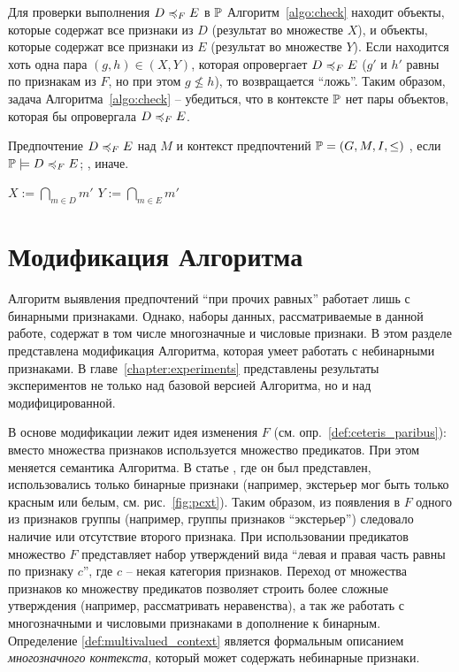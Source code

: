 		Для проверки выполнения $D \preccurlyeq_{F} E$ в $\mathbb{P}$ Алгоритм~\ref{algo:check} находит объекты, которые содержат все признаки из $D$ (результат во множестве $X$), и объекты, которые содержат все признаки из $E$ (результат во множестве $Y$). Если находится хоть одна пара $(g,h) \in (X, Y)$, которая опровергает $D \preccurlyeq_{F} E$ ($g'$ и $h'$ равны по признакам из $F$, но при этом $g \nleq h$), то возвращается ``ложь''. Таким образом, задача Алгоритма~\ref{algo:check} – убедиться, что в контексте $\mathbb{P}$ нет пары объектов, которая бы опровергала $D \preccurlyeq_{F} E$. 
	
	
		\begin{algorithm}
			\caption{$(\DEF, \PP)$ \cite[Алг.~2]{Obiedkov:2013}}
			\label{algo:check}
			\begin{algorithmic}[1]
				\REQUIRE Предпочтение $D \preccurlyeq_{F} E$ над $M$ и контекст предпочтений $\mathbb{P} = (G, M, I, \leq)$
				\ENSURE \TRUE, если $\mathbb{P} \models D \preccurlyeq_{F} E$; \FALSE, иначе.
				\item[]
				\STATE $X := \bigcap_{m \in D}m'$
				\STATE $Y := \bigcap_{m \in E}m'$
				\RETURN \FALSE
				\ENDIF
				\ENDFOR
				\ENDFOR
				\RETURN \TRUE
			\end{algorithmic}
		\end{algorithm}
		


\section{Модификация Алгоритма}	
\label{sec:modification}	
		
	Алгоритм выявления предпочтений \enquote{при прочих равных} работает лишь с бинарными признаками. Однако, наборы данных, рассматриваемые в данной работе, содержат в том числе многозначные и числовые признаки. В этом разделе представлена модификация Алгоритма, которая умеет работать с небинарными признаками. В главе~\ref{chapter:experiments} представлены результаты экспериментов не только над базовой версией Алгоритма, но и над модифицированной.
	
	В основе модификации лежит идея изменения $F$ (см. опр.~\ref{def:ceteris_paribus}): вместо множества признаков используется множество предикатов. При этом меняется семантика Алгоритма. В статье \cite{Obiedkov:2013}, где он был представлен, использовались только бинарные признаки (например, экстерьер мог быть только красным или белым, см. рис.~\ref{fig:pcxt}). Таким образом, из появления в $F$ одного из признаков группы (например, группы признаков ``экстерьер'') следовало наличие или отсутствие второго признака. При использовании предикатов множество $F$ представляет набор утверждений вида ``левая и правая часть равны по признаку $c$'', где $c$ – некая категория признаков. Переход от множества признаков ко множеству предикатов позволяет строить более сложные утверждения (например, рассматривать неравенства), а так же работать с многозначными и числовыми признаками в дополнение к бинарным. Определение \ref{def:multivalued_context}\cite{Ganter:1997} является формальным описанием \emph{многозначного контекста}, который может содержать небинарные признаки.
	
